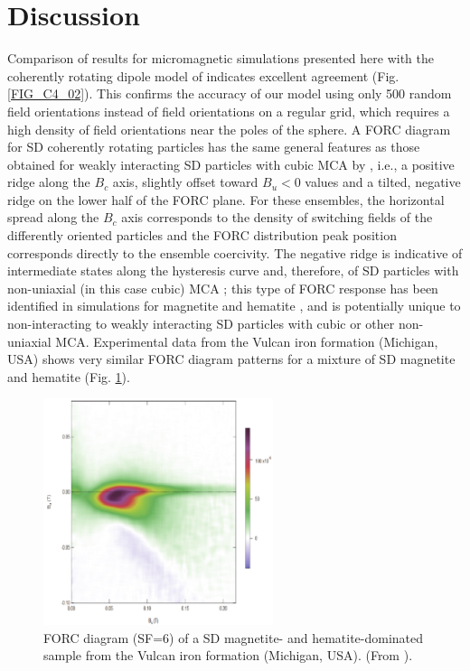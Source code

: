 \section{Discussion}
Comparison of results for micromagnetic simulations presented here with the coherently rotating dipole model of \citet{ValdezGrijalva2017} indicates excellent agreement (Fig. \ref{FIG_C4_02}). This confirms the accuracy of our model using only 500 random field orientations instead of field orientations on a regular grid, which requires a high density of field orientations near the poles of the sphere. A FORC diagram for SD coherently rotating particles has the same general features as those obtained for weakly interacting SD particles with cubic MCA by \citet{Harrison2014}, i.e., a positive ridge along the $B_c$ axis, slightly offset toward $B_u<0$ values and a tilted, negative ridge on the lower half of the FORC plane. For these ensembles, the horizontal spread along the $B_c$ axis corresponds to the density of switching fields of the differently oriented particles and the FORC distribution peak position corresponds directly to the ensemble coercivity. The negative ridge is indicative of intermediate states along the hysteresis curve and, therefore, of SD particles with non-uniaxial (in this case cubic) MCA \citep{ValdezGrijalva2017}; this type of FORC response has been identified in simulations for magnetite \citep{Harrison2014} and hematite \citep{Harrison2017}, and is potentially unique to non-interacting to weakly interacting SD particles with cubic or other non-uniaxial MCA. Experimental data from the Vulcan iron formation (Michigan, USA) \citep{Laird2017} shows very similar FORC diagram patterns for a mixture of SD magnetite and hematite (Fig. \ref{FIG_C4_Laird2017}).
\begin{figure}
\centering
\includegraphics[width=0.6\textwidth]{research-3/figs/Laird2017_thesis.pdf}
\caption[FORC diagram of a SD magnetite and hematite sample]{FORC diagram (SF=6) of a SD magnetite- and hematite-dominated sample from the Vulcan iron formation (Michigan, USA). (From \citet{Laird2017}).}
\label{FIG_C4_Laird2017}
\end{figure}\par

